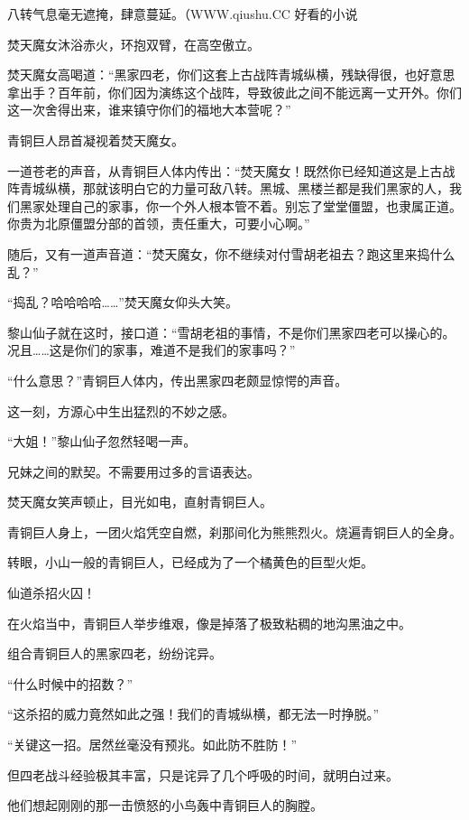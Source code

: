 
\begin{this_body}

八转气息毫无遮掩，肆意蔓延。（WWW.qiushu.CC 好看的小说

焚天魔女沐浴赤火，环抱双臂，在高空傲立。

焚天魔女高喝道：“黑家四老，你们这套上古战阵青城纵横，残缺得很，也好意思拿出手？百年前，你们因为演练这个战阵，导致彼此之间不能远离一丈开外。你们这一次舍得出来，谁来镇守你们的福地大本营呢？”

青铜巨人昂首凝视着焚天魔女。

一道苍老的声音，从青铜巨人体内传出：“焚天魔女！既然你已经知道这是上古战阵青城纵横，那就该明白它的力量可敌八转。黑城、黑楼兰都是我们黑家的人，我们黑家处理自己的家事，你一个外人根本管不着。别忘了堂堂僵盟，也隶属正道。你贵为北原僵盟分部的首领，责任重大，可要小心啊。”

随后，又有一道声音道：“焚天魔女，你不继续对付雪胡老祖去？跑这里来捣什么乱？”

“捣乱？哈哈哈哈……”焚天魔女仰头大笑。

黎山仙子就在这时，接口道：“雪胡老祖的事情，不是你们黑家四老可以操心的。况且……这是你们的家事，难道不是我们的家事吗？”

“什么意思？”青铜巨人体内，传出黑家四老颇显惊愕的声音。

这一刻，方源心中生出猛烈的不妙之感。

“大姐！”黎山仙子忽然轻喝一声。

兄妹之间的默契。不需要用过多的言语表达。

焚天魔女笑声顿止，目光如电，直射青铜巨人。

青铜巨人身上，一团火焰凭空自燃，刹那间化为熊熊烈火。烧遍青铜巨人的全身。

转眼，小山一般的青铜巨人，已经成为了一个橘黄色的巨型火炬。

仙道杀招火囚！

在火焰当中，青铜巨人举步维艰，像是掉落了极致粘稠的地沟黑油之中。

组合青铜巨人的黑家四老，纷纷诧异。

“什么时候中的招数？”

“这杀招的威力竟然如此之强！我们的青城纵横，都无法一时挣脱。”

“关键这一招。居然丝毫没有预兆。如此防不胜防！”

但四老战斗经验极其丰富，只是诧异了几个呼吸的时间，就明白过来。

他们想起刚刚的那一击愤怒的小鸟轰中青铜巨人的胸膛。


\end{this_body}
